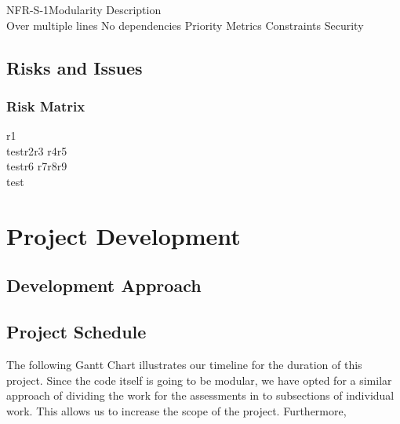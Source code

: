 \documentclass[coverpage,lineno]{../custom}
\begin{document}
\NonFunctionalReqS
{NFR-S-1}{Modularity}
{Description\\Over multiple lines}
{No dependencies}
{Priority}
{Metrics}
{Constraints}
{Security}

\subsection{Risks and Issues}
\label{ssec:risks}

\subsubsection{Risk Matrix}

\RiskMatrix
{r1\\test}{r2}{r3}
{r4}{r5\\test}{r6}
{r7}{r8}{r9\\test}

\section{Project Development}
\label{sec:dev}

\subsection{Development Approach}
\label{ssec:dev_approach}

\subsection{Project Schedule}
\label{ssec:schedule}

The following Gantt Chart illustrates our timeline for the duration of this project. Since the code itself is going to be modular, we have opted for a similar approach of dividing the work for the assessments in to subsections of individual work. This allows us to increase the scope of the project. Furthermore,    
\end{document}
